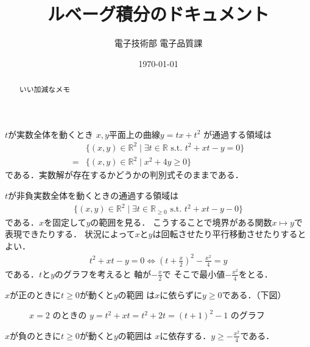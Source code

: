 \documentclass[dvipdfmx,a4paper,12pt]{jsarticle}
\title{ルベーグ積分のドキュメント}
\author{電子技術部 電子品質課}
\date{\today}
\theoremstyle{definition}
\begin{document}
\begin{abstract}
    いい加減なメモ
\end{abstract}

\tableofcontents
\newpage

$t$が実数全体を動くとき
$x,y$平面上の曲線$y=tx+t^2$
が通過する領域は
\begin{align*}
    &\{ (x,y)\in \mathbb{R}^2
    \mid \exists t\in \mathbb{R}
    \text{ s.t. }t^2+xt-y=0\}\\
    =
    &\{ (x,y)\in \mathbb{R}^2
    \mid x^2+4y\geq 0\}
\end{align*}
である．実数解が存在するかどうかの判別式そのままである．

$t$が非負実数全体を動くときの通過する領域は
\begin{align*}
    \{ (x,y)\in \mathbb{R}^2
    \mid \exists t\in \mathbb{R}_{\geq 0}
    \text{ s.t. }t^2+xt-y-0\}
\end{align*}
である．$x$を固定して$y$の範囲を見る．
こうすることで境界がある関数$x\mapsto y$で
表現できたりする．
状況によって$x$と$y$は回転させたり平行移動させたりするとよい．
\begin{align*}
    t^2+xt-y=0\Leftrightarrow 
    \left( t+\frac{x}{2}\right)^2-
    \frac{x^2}{4}=y
\end{align*}
である．$t$と$y$のグラフを考えると
軸が$\displaystyle-\frac{x}{2}$で
そこで最小値$\displaystyle-\frac{x^2}{4}$をとる．

$x$が正のときに$t\geq 0$が動くと$y$の範囲
は$x$に依らずに$y\geq 0$である．（下図）

\begin{figure}[htbp]
    \centering
    \caption{$x=2$ のときの $y=t^2+xt=t^2+2t=(t+1)^2-1$ のグラフ}
\end{figure}

$x$が負のときに$t\geq 0$が動くと$y$の範囲は
$x$に依存する．$\displaystyle y\geq -\frac{x^2}{4}$である．
\end{document}
